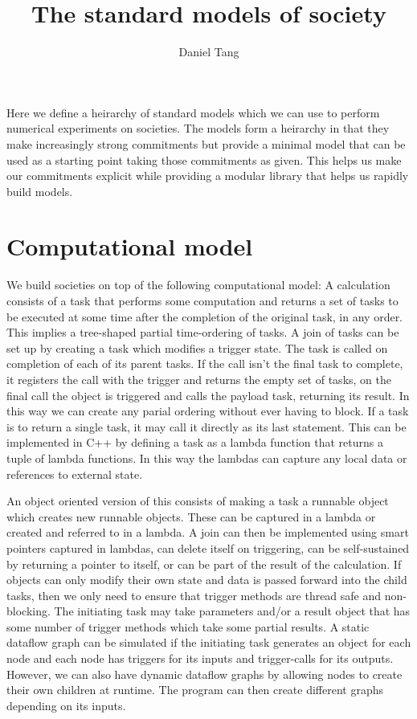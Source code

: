 \documentclass[a4paper]{article}
\title{The standard models of society}
\author{Daniel Tang}
\begin{document}
\maketitle

Here we define a heirarchy of standard models which we can use to perform numerical experiments on societies. The models form a heirarchy in that they make increasingly strong commitments but provide a minimal model that can be used as a starting point taking those commitments as given. This helps us make our commitments explicit while providing a modular library that helps us rapidly build models.

\section{Computational model}

We build societies on top of the following computational model: A calculation consists of a task that performs some computation and returns a set of tasks to be executed at some time after the completion of the original task, in any order. This implies a tree-shaped partial time-ordering of tasks. A join of tasks can be set up by creating a task which modifies a trigger state. The task is called on completion of each of its parent tasks. If the call isn't the final task to complete, it registers the call with the trigger and returns the empty set of tasks, on the final call the object is triggered and calls the payload task, returning its result. In this way we can create any parial ordering without ever having to block. If a task is to return a single task, it may call it directly as its last statement. This can be implemented in C++ by defining a task as a lambda function that returns a tuple of lambda functions. In this way the lambdas can capture any local data or references to external state.

An object oriented version of this consists of making a task a runnable object which creates new runnable objects. These can be captured in a lambda or created and referred to in a lambda. A join can then be implemented using smart pointers captured in lambdas, can delete itself on triggering, can be self-sustained by returning a pointer to itself, or can be part of the result of the calculation. If objects can only modify their own state and data is passed forward into the child tasks, then we only need to ensure that trigger methods are thread safe and non-blocking. The initiating task may take parameters and/or a result object that has some number of trigger methods which take some partial results. A static dataflow graph can be simulated if the initiating task generates an object for each node and each node has triggers for its inputs and trigger-calls for its outputs. However, we can also have dynamic dataflow graphs by allowing nodes to create their own children at runtime. The program can then create different graphs depending on its inputs.
\end{document}

